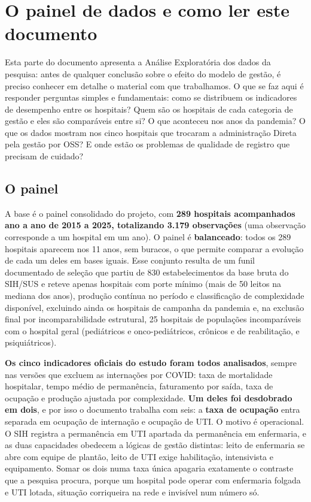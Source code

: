 \section{O painel de dados e como ler este documento}
\label{sec:painel}

Esta parte do documento apresenta a Análise Exploratória dos dados da
pesquisa: antes de qualquer conclusão sobre o efeito do modelo de
gestão, é preciso conhecer em detalhe o material com que trabalhamos.
O que se faz aqui é responder perguntas simples e fundamentais: como se
distribuem os indicadores de desempenho entre os hospitais? Quem são os
hospitais de cada categoria de gestão e eles são comparáveis entre si?
O que aconteceu nos anos da pandemia? O que os dados mostram nos cinco
hospitais que trocaram a administração Direta pela gestão por OSS? E
onde estão os problemas de qualidade de registro que precisam de
cuidado?

\subsection{O painel}

A base é o painel consolidado do projeto, com \textbf{289 hospitais
acompanhados ano a ano de 2015 a 2025, totalizando 3.179 observações}
(uma observação corresponde a um hospital em um ano). O painel é
\textbf{balanceado}: todos os 289 hospitais aparecem nos 11 anos, sem
buracos, o que permite comparar a evolução de cada um deles em bases
iguais. Esse conjunto resulta de um funil documentado de seleção que
partiu de 830 estabelecimentos da base bruta do SIH/SUS e reteve
apenas hospitais com porte mínimo (mais de 50 leitos na mediana dos
anos), produção contínua no período e classificação de complexidade
disponível, excluindo ainda os hospitais de campanha da pandemia e,
na exclusão final por incomparabilidade estrutural, 25 hospitais de
populações incomparáveis com o hospital geral (pediátricos
e onco-pediátricos, crônicos e de reabilitação, e psiquiátricos).

\textbf{Os cinco indicadores oficiais do estudo foram todos analisados},
sempre nas versões que excluem as internações por COVID: taxa de
mortalidade hospitalar, tempo médio de permanência, faturamento por
saída, taxa de ocupação e produção ajustada por complexidade. \textbf{Um deles foi
desdobrado em dois}, e por isso o documento trabalha com seis: a
\textbf{taxa de ocupação} entra separada em ocupação de internação e
ocupação de UTI. O motivo é operacional. O SIH registra a permanência em
UTI apartada da permanência em enfermaria, e as duas capacidades obedecem
a lógicas de gestão distintas: leito de enfermaria se abre com equipe de
plantão, leito de UTI exige habilitação, intensivista e equipamento. Somar
os dois numa taxa única apagaria exatamente o contraste que a pesquisa
procura, porque um hospital pode operar com enfermaria folgada e UTI
lotada, situação corriqueira na rede e invisível num número só.

